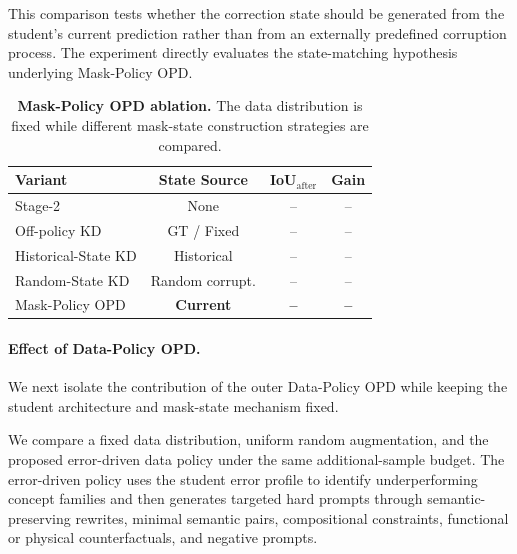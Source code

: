 This comparison tests whether the correction state should be generated from the student's current prediction rather than from an externally predefined corruption process.
The experiment directly evaluates the state-matching hypothesis underlying Mask-Policy OPD.


\begin{table}[t]
    \centering
    \caption{
    \textbf{Mask-Policy OPD ablation.}
    The data distribution is fixed while different mask-state construction strategies are compared.
    }
    \label{tab:ablation_mask_policy}
    \small
    \setlength{\tabcolsep}{4pt}
    \begin{tabular}{lccc}
        \toprule
        \textbf{Variant}
        & State Source
        & IoU$_{\mathrm{after}}$
        & Gain \\
        \midrule
        Stage-2
        & None
        & --
        & -- \\

        Off-policy KD
        & GT / Fixed
        & --
        & -- \\

        Historical-State KD
        & Historical
        & --
        & -- \\

        Random-State KD
        & Random corrupt.
        & --
        & -- \\

        Mask-Policy OPD
        & \textbf{Current}
        & \textbf{--}
        & \textbf{--} \\
        \bottomrule
    \end{tabular}
\end{table}


\paragraph{Effect of Data-Policy OPD.}
We next isolate the contribution of the outer Data-Policy OPD while keeping the student architecture and mask-state mechanism fixed.

We compare a fixed data distribution, uniform random augmentation, and the proposed error-driven data policy under the same additional-sample budget.
The error-driven policy uses the student error profile to identify underperforming concept families and then generates targeted hard prompts through semantic-preserving rewrites, minimal semantic pairs, compositional constraints, functional or physical counterfactuals, and negative prompts.

